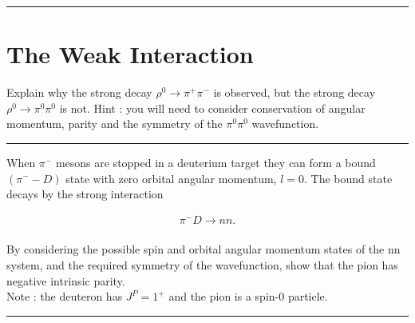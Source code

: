 
\noindent\rule{7in}{2.8pt}
\section{The Weak Interaction}
    
\begin{problem}{11.1}
Explain why the strong decay $\rho^0\to\pi^+\pi^-$ is observed, but the strong decay $\rho^0\to\pi^0\pi^0$ is not.
Hint : you will need to consider conservation of angular momentum, parity and the symmetry of the $\pi^0\pi^0$ wavefunction.
\end{problem}
\begin{solution}

\end{solution}

\noindent\rule{7in}{1.5pt}


\begin{problem}{11.2}
When $\pi^-$ mesons are stopped in a deuterium target they can form a bound $(\pi^--D)$ state with zero orbital angular momentum, $l = 0$. The bound state decays by the strong interaction

\begin{align*}
    \pi^-D\to nn.
\end{align*}\\
By considering the possible spin and orbital angular momentum states of the nn system, and the required symmetry of the wavefunction, show that the pion has negative intrinsic parity.\\

Note : the deuteron has $J^P =1^+$ and the pion is a spin-0 particle.
\end{problem}
\begin{solution}

\end{solution}

\noindent\rule{7in}{1.5pt}


